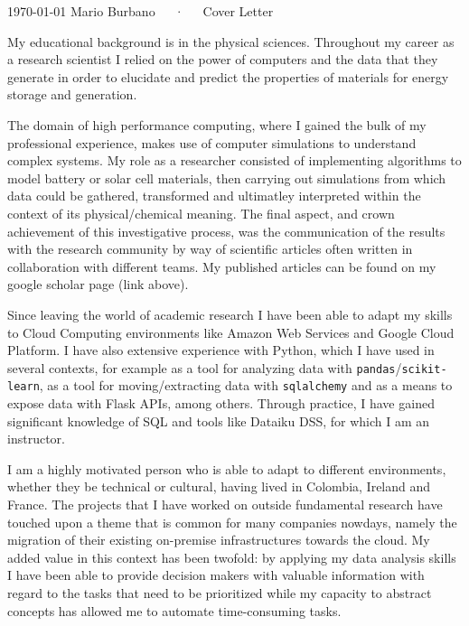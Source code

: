 \documentclass[11pt, a4paper]{awesome-cv}
\begin{document}
\makecvheader[R]

\makecvfooter
  {\today}
  {Mario Burbano~~~·~~~Cover Letter}
  {}

\makelettertitle

\begin{cvletter}


My educational background is in the physical sciences. Throughout my career as a research scientist I relied on the power of computers and the data that they generate in order to elucidate and predict the properties of materials for energy storage and generation.

The domain of high performance computing, where I gained the bulk of my professional experience, makes use of computer simulations to understand complex systems. My role as a researcher consisted of implementing algorithms to model battery or solar cell materials, then carrying out simulations from which data could be gathered, transformed and ultimatley interpreted within the context of its physical/chemical meaning. The final aspect, and crown achievement of this investigative process, was the communication of the results with the research community by way of scientific articles often written in collaboration with different teams. My published articles can be found on my google scholar page (link above).

Since leaving the world of academic research I have been able to adapt my skills to Cloud Computing environments like Amazon Web Services and Google Cloud Platform. I have also extensive experience with Python, which I have used in several contexts, for example as a tool for analyzing data with \texttt{pandas}/\texttt{scikit-learn}, as a tool for moving/extracting data with \texttt{sqlalchemy} and as a means to expose data with Flask APIs, among others. Through practice, I have gained significant knowledge of SQL and tools like Dataiku DSS, for which I am an instructor.

I am a highly motivated person who is able to adapt to different environments, whether they be technical or cultural, having lived in Colombia, Ireland and France. The projects that I have worked on outside fundamental research have touched upon a theme that is common for many companies nowdays, namely the migration of their existing on-premise infrastructures towards the cloud. My added value in this context has been twofold: by applying my data analysis skills I have been able to provide decision makers with valuable information with regard to the tasks that need to be prioritized while my capacity to abstract concepts has allowed me to automate time-consuming tasks.


\end{cvletter}
\end{document}
